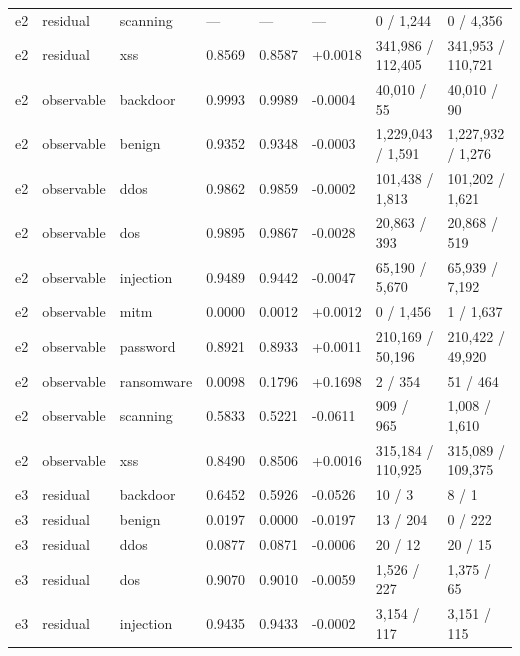 \begin{landscape}
\begin{longtable}
{}e2 & residual & scanning & — & — & — & 0 /\allowbreak{} 1,244 & 0 /\allowbreak{} 4,356 \\
{}e2 & residual & xss & 0.8569 & 0.8587 & +\allowbreak{}0.0018 & 341,986 /\allowbreak{} 112,405 & 341,953 /\allowbreak{} 110,721 \\
{}e2 & observable & backdoor & 0.9993 & 0.9989 & -0.0004 & 40,010 /\allowbreak{} 55 & 40,010 /\allowbreak{} 90 \\
{}e2 & observable & benign & 0.9352 & 0.9348 & -0.0003 & 1,229,043 /\allowbreak{} 1,591 & 1,227,932 /\allowbreak{} 1,276 \\
{}e2 & observable & ddos & 0.9862 & 0.9859 & -0.0002 & 101,438 /\allowbreak{} 1,813 & 101,202 /\allowbreak{} 1,621 \\
{}e2 & observable & dos & 0.9895 & 0.9867 & -0.0028 & 20,863 /\allowbreak{} 393 & 20,868 /\allowbreak{} 519 \\
{}e2 & observable & injection & 0.9489 & 0.9442 & -0.0047 & 65,190 /\allowbreak{} 5,670 & 65,939 /\allowbreak{} 7,192 \\
{}e2 & observable & mitm & 0.0000 & 0.0012 & +\allowbreak{}0.0012 & 0 /\allowbreak{} 1,456 & 1 /\allowbreak{} 1,637 \\
{}e2 & observable & password & 0.8921 & 0.8933 & +\allowbreak{}0.0011 & 210,169 /\allowbreak{} 50,196 & 210,422 /\allowbreak{} 49,920 \\
{}e2 & observable & ransomware & 0.0098 & 0.1796 & +\allowbreak{}0.1698 & 2 /\allowbreak{} 354 & 51 /\allowbreak{} 464 \\
{}e2 & observable & scanning & 0.5833 & 0.5221 & -0.0611 & 909 /\allowbreak{} 965 & 1,008 /\allowbreak{} 1,610 \\
{}e2 & observable & xss & 0.8490 & 0.8506 & +\allowbreak{}0.0016 & 315,184 /\allowbreak{} 110,925 & 315,089 /\allowbreak{} 109,375 \\
{}e3 & residual & backdoor & 0.6452 & 0.5926 & -0.0526 & 10 /\allowbreak{} 3 & 8 /\allowbreak{} 1 \\
{}e3 & residual & benign & 0.0197 & 0.0000 & -0.0197 & 13 /\allowbreak{} 204 & 0 /\allowbreak{} 222 \\
{}e3 & residual & ddos & 0.0877 & 0.0871 & -0.0006 & 20 /\allowbreak{} 12 & 20 /\allowbreak{} 15 \\
{}e3 & residual & dos & 0.9070 & 0.9010 & -0.0059 & 1,526 /\allowbreak{} 227 & 1,375 /\allowbreak{} 65 \\
{}e3 & residual & injection & 0.9435 & 0.9433 & -0.0002 & 3,154 /\allowbreak{} 117 & 3,151 /\allowbreak{} 115 \\

\end{longtable}
\end{landscape}
